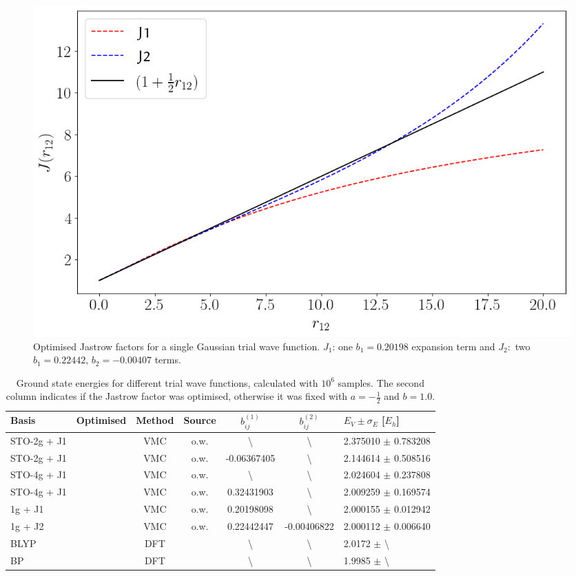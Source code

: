 \documentclass[final,3p,times,twocolumn]{elsarticle}
\newcommand{\cmark}{\ding{51}}%
\newcommand{\xmark}{\ding{55}}%
\begin{document}

	\begin{figure}
		\centering
		\includegraphics[width=\linewidth]{../plots/jastopt.png}
		\caption{Optimised Jastrow factors for a single Gaussian trial wave function. $J_1$: one $b_{1} = 0.20198$ expansion term and $J_2:$ two $b_1 = 0.22442$, $b_2=-0.00407$ terms.}
		\label{fig:jast-optim}
	\end{figure}
	\begin{table}
		\centering
		\begin{tabular}{@{}lcccccl@{}} 
			\toprule
			Basis & Optimised & Method & Source & $b^{(1)}_{ij}$ & $b^{(2)}_{ij}$ & $E_V \pm \sigma_E$ [$E_h$]\\ \midrule
			STO-2g + J1 & \xmark & VMC & o.w. & \textbackslash & \textbackslash & 2.375010 $\pm$ 0.783208 \\ 
			STO-2g + J1 & \cmark & VMC & o.w. & -0.06367405 & \textbackslash & 2.144614 $\pm$ 0.508516\\ 
			STO-4g + J1 & \xmark & VMC & o.w. & \textbackslash & \textbackslash & 2.024604 $\pm$ 0.237808 \\ 
			STO-4g + J1 & \cmark & VMC & o.w. & 0.32431903 & \textbackslash & 2.009259 $\pm$ 0.169574\\ 
			1g + J1 	& \cmark & VMC & o.w. & 0.20198098 & \textbackslash & 2.000155 $\pm$ 0.012942\\ 
			1g + J2 	& \cmark & VMC & o.w. & 0.22442447 & -0.00406822 & 2.000112 $\pm$ 0.006640\\
			BLYP 		& \xmark & DFT & \cite{kais1993density} & \textbackslash & \textbackslash & 2.0172 $\pm$ \textbackslash \\ 
			BP			& \xmark & DFT & \cite{kais1993density} & \textbackslash & \textbackslash & 1.9985 $\pm$ \textbackslash \\ 
			\bottomrule
		\end{tabular}
		\caption{\label{tab:VMCenergies}Ground state energies for different trial wave functions, calculated with $10^6$ samples. The second column indicates if the Jastrow factor was optimised, otherwise it was fixed with $a=-\frac{1}{2}$ and $b=1.0$.}
	\end{table}
	
\end{document}
